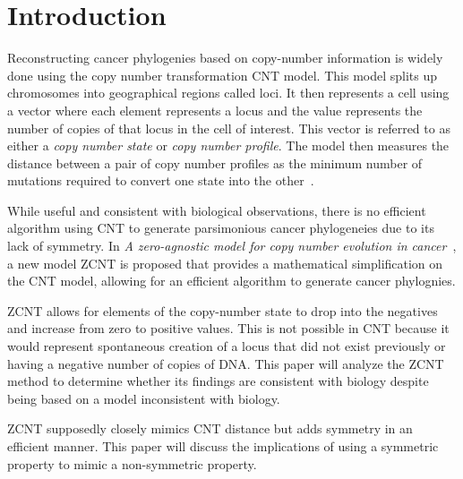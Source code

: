 \section{Introduction}

Reconstructing cancer phylogenies based on copy-number information is widely done using the copy number transformation CNT model. This model splits up chromosomes into geographical regions called loci. It then represents a cell using a vector where each element represents a locus and the value represents the number of copies of that locus in the cell of interest. This vector is referred to as either a {\it copy number state\/} or {\it copy number profile}. The model then measures the distance between a pair of copy number profiles as the minimum number of mutations required to convert one state into the other~\cite{cnt_paper}. 

While useful and consistent with biological observations, there is no efficient algorithm using CNT to generate parsimonious cancer phylogeneies due to its lack of symmetry. In {\it A zero-agnostic model for copy number evolution in cancer\/}~\cite{zcnt_paper}, a new model ZCNT is proposed that provides a mathematical simplification on the CNT model, allowing for an efficient algorithm to generate cancer phylognies.

ZCNT allows for elements of the copy-number state to drop into the negatives and increase from zero to positive values. This is not possible in CNT because it would represent spontaneous creation of a locus that did not exist previously or having a negative number of copies of DNA\@. This paper will analyze the ZCNT method to determine whether its findings are consistent with biology despite being based on a model inconsistent with biology. 

ZCNT supposedly closely mimics CNT distance but adds symmetry in an efficient manner. This paper will discuss the implications of using a symmetric property to mimic a non-symmetric property. 